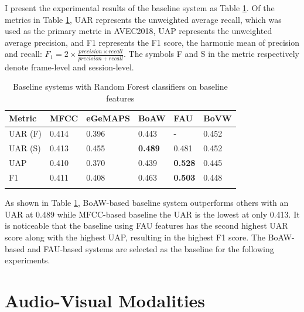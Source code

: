 I present the experimental results of the baseline system as Table \ref{tab:baseline}. Of the metrics in Table \ref{tab:baseline}, UAR represents the unweighted average recall, which was used as the primary metric in AVEC2018, UAP represents the unweighted average precision, and F1 represents the F1 score, the harmonic mean of precision and recall: $F_1 = 2 \times \frac{precision \times recall}{precision + recall}$. The symbols F and S in the metric respectively denote frame-level and session-level. 


\begin{table}[htb]
    \small
    \centering
    \caption{Baseline systems with Random Forest classifiers on baseline features}
    \begin{tabular}{l|p{1.5cm}|p{1.9cm}|p{1.5cm}|p{1.5cm}|p{1.5cm}}
    \Xhline{2\arrayrulewidth}
    \hline
         Metric  & MFCC  & eGeMAPS & BoAW & FAU  & BoVW \\
         \hline
         UAR (F) & 0.414 & 0.396 & 0.443 & -     & 0.452 \\
         UAR (S) & 0.413 & 0.455 & \textbf{0.489} & 0.481 & 0.452 \\
         UAP     & 0.410 & 0.370 & 0.439 & \textbf{0.528} & 0.445 \\
         F1      & 0.411 & 0.408 & 0.463 & \textbf{0.503} & 0.448 \\
    \hline
    \Xhline{2\arrayrulewidth}
    \end{tabular}
    \label{tab:baseline}
\end{table}


As shown in Table \ref{tab:baseline}, BoAW-based baseline system outperforms others with an UAR at 0.489 while MFCC-based baseline the UAR is the lowest at only 0.413. It is noticeable that the baseline using FAU features has the second highest UAR score along with the highest UAP, resulting in the highest F1 score. The BoAW-based and FAU-based systems are selected as the baseline for the following experiments.





\section{Audio-Visual Modalities}


